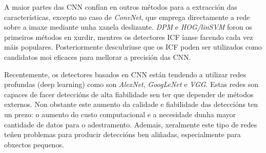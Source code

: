 \documentclass[galician]{./head/uvigo-tfg}
\begin{document}
\begin{itemize}
        \par A maior partes das CNN confían en outros métodos para a extracción das características, excepto no caso de \textit{ConvNet}\cite{sermanet2013pedestrian}, que emprega directamente a rede sobre a imaxe mediante unha xanela deslizante. \textit{DPM}\cite{felzenszwalb2009object} e \textit{HOG/linSVM}\cite{inria} foron os primeiros métodos en xurdir, mentres os detectores ICF íanse facendo cada vez máis populares. Posteriormente descubriuse que os ICF poden ser utilizados como candidatos moi eficaces para mellorar a precisión das CNN\cite{angelova2015real}\cite{hosang2015taking}.
        \par Recentemente, os detectores basados en CNN están tendendo a utilizar redes profundas (deep learning) como son \textit{AlexNet}\cite{krizhevsky2012imagenet}, \textit{GoogLeNet}\cite{szegedy2015going} e \textit{VGG}\cite{simonyan2014very}. Estas redes son capaces de facer deteccións de alta fiabilidade sen ter que depender de métodos externos. Non obstante este aumento da calidade e fiabilidade das deteccións ten un prezo: o aumento do custo computacional e a necesidade dunha mayor cantidade de datos para o adestramento. Ademais, xeralmente este tipo de redes teñen problemas para producir deteccións ben aliñadas, especialmente para obxectos pequenos.
    \end{itemize}
    
\end{document}
